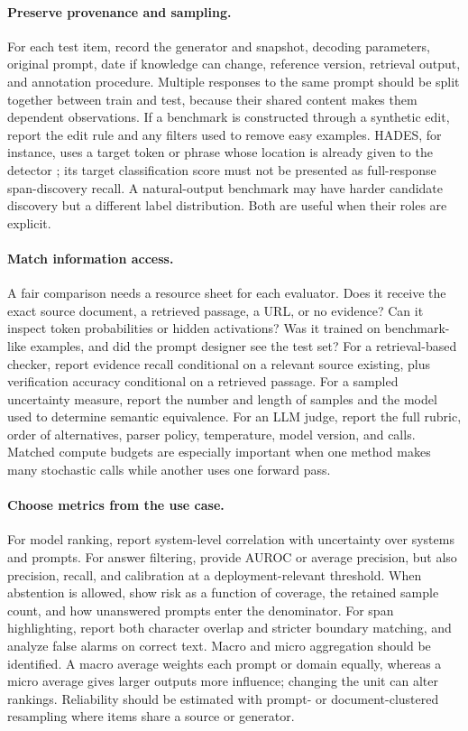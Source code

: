 \documentclass[11pt]{article}
\begin{document}
\paragraph{Preserve provenance and sampling.} For each test item, record the generator and snapshot, decoding parameters, original prompt, date if knowledge can change, reference version, retrieval output, and annotation procedure. Multiple responses to the same prompt should be split together between train and test, because their shared content makes them dependent observations. If a benchmark is constructed through a synthetic edit, report the edit rule and any filters used to remove easy examples. HADES, for instance, uses a target token or phrase whose location is already given to the detector \citep{I003}; its target classification score must not be presented as full-response span-discovery recall. A natural-output benchmark may have harder candidate discovery but a different label distribution. Both are useful when their roles are explicit.

\paragraph{Match information access.} A fair comparison needs a resource sheet for each evaluator. Does it receive the exact source document, a retrieved passage, a URL, or no evidence? Can it inspect token probabilities or hidden activations? Was it trained on benchmark-like examples, and did the prompt designer see the test set? For a retrieval-based checker, report evidence recall conditional on a relevant source existing, plus verification accuracy conditional on a retrieved passage. For a sampled uncertainty measure, report the number and length of samples and the model used to determine semantic equivalence. For an LLM judge, report the full rubric, order of alternatives, parser policy, temperature, model version, and calls. Matched compute budgets are especially important when one method makes many stochastic calls while another uses one forward pass.

\paragraph{Choose metrics from the use case.} For model ranking, report system-level correlation with uncertainty over systems and prompts. For answer filtering, provide AUROC or average precision, but also precision, recall, and calibration at a deployment-relevant threshold. When abstention is allowed, show risk as a function of coverage, the retained sample count, and how unanswered prompts enter the denominator. For span highlighting, report both character overlap and stricter boundary matching, and analyze false alarms on correct text. Macro and micro aggregation should be identified. A macro average weights each prompt or domain equally, whereas a micro average gives larger outputs more influence; changing the unit can alter rankings. Reliability should be estimated with prompt- or document-clustered resampling where items share a source or generator.
\end{document}
